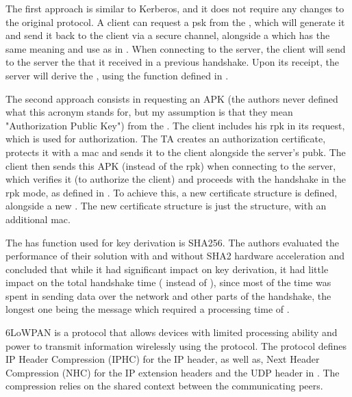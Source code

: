 \documentclass{llncs}
\begin{document}
The first approach is similar to Kerberos\cite{RFC4120}, and it does not require any
changes to the original protocol. A client can request a \gls{psk}  from the ,
which will generate it and send it back to the client via a secure channel, alongside
a  which has the same meaning and use as in \cite{RFC4279}. When connecting to the server,
the client will send to the server the  that it received in a previous
handshake. Upon its receipt, the server will derive the , using the
 function defined in \cite{RFC5246}.

The second approach consists in requesting an APK (the authors never defined
what this acronym stands for, but my assumption is that they mean "Authorization Public Key")
from the . The client includes his \gls{rpk} in its request, which is used for authorization. The TA
creates an authorization certificate, protects it with a \gls{mac} and sends it
to the client alongside the server's \gls{pubk}.
The client then sends this APK (instead of the \gls{rpk})
when connecting to the server, which verifies it (to authorize the client)
and proceeds with the handshake in the \gls{rpk} mode, as defined in  \cite{RFC4279}.
To achieve this, a new certificate structure is defined, alongside a new .
The new certificate structure is just the  \cite{RFC7250} structure, with an
additional \gls{mac}.

The has function used for key derivation is SHA256. The authors evaluated the
performance of their solution with and without SHA2 hardware acceleration and
concluded that while it had significant impact on key derivation, it had little
impact on the total handshake time ( instead of ), since most of the time was spent in sending
data over the network and other parts of the handshake, the longest one being
the  message which required a processing time
of .

6LoWPAN\cite{RFC4944} is a protocol that allows devices with limited processing
ability and power to transmit information wirelessly using the 
protocol. The protocol defines IP Header Compression (IPHC) for the IP header, as well as,
Next Header Compression (NHC) for the IP extension headers and the UDP header in \cite{RFC6282}.
The compression relies on the shared context between the communicating peers.
\end{document}
